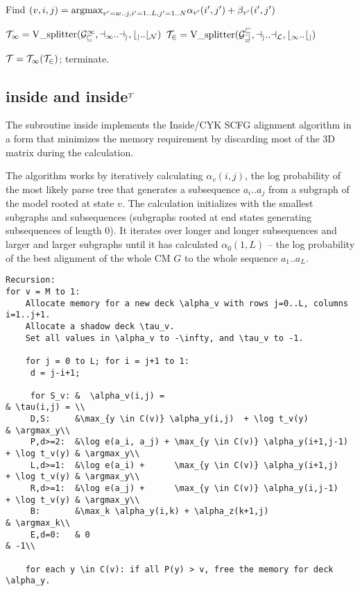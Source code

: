 \documentclass[11pt]{article}
\begin{document}
Find $(v,i,j) = \mbox{\rm{argmax}}_{v'=w..j, i'=1..L, j'=1..N} \alpha_{v'}(i',j') + \beta_{v'}(i',j')$

$\cal{T}_1 = \mbox{V\_splitter}(G^1_v, a_1..a_i, b_j..b_N)$
$\cal{T}_2 = \mbox{V\_splitter}(G^v_w, a_i..a_L, b_1..b_j)$

$\cal{T} = \cal{T}_1 (\cal{T}_2)$; terminate.

\subsection{inside and inside$^{\cal{T}}$}

The subroutine inside implements the Inside/CYK SCFG alignment
algorithm in a form that minimizes the memory requirement by
discarding most of the 3D matrix during the calculation.

The algorithm works by iteratively calculating $\alpha_v(i,j)$, the
log probability of the most likely parse tree that generates a
subsequence $a_i..a_j$ from a subgraph of the model rooted at state
$v$. The calculation initializes with the smallest subgraphs and
subsequences (subgraphs rooted at end states generating subsequences
of length 0). It iterates over longer and longer subsequences and
larger and larger subgraphs until it has calculated $\alpha_0(1,L)$ --
the log probability of the best alignment of the whole CM $G$ to the
whole sequence $a_1..a_L$.

\begin{verbatim}
Recursion:
for v = M to 1:
    Allocate memory for a new deck \alpha_v with rows j=0..L, columns i=1..j+1.
    Allocate a shadow deck \tau_v.
    Set all values in \alpha_v to -\infty, and \tau_v to -1.

    for j = 0 to L; for i = j+1 to 1:
     d = j-i+1;
     
     for S_v: &  \alpha_v(i,j) =                                                    & \tau(i,j) = \\
     D,S:     &\max_{y \in C(v)} \alpha_y(i,j)  + \log t_v(y)	                    & \argmax_y\\
     P,d>=2:  &\log e(a_i, a_j) + \max_{y \in C(v)} \alpha_y(i+1,j-1) + \log t_v(y) & \argmax_y\\
     L,d>=1:  &\log e(a_i) +      \max_{y \in C(v)} \alpha_y(i+1,j)   + \log t_v(y) & \argmax_y\\
     R,d>=1:  &\log e(a_j) +      \max_{y \in C(v)} \alpha_y(i,j-1)   + \log t_v(y) & \argmax_y\\
     B:       &\max_k \alpha_y(i,k) + \alpha_z(k+1,j)                               & \argmax_k\\
     E,d=0:   & 0                                                                   & -1\\

    for each y \in C(v): if all P(y) > v, free the memory for deck \alpha_y.
\end{verbatim}
\end{document}
